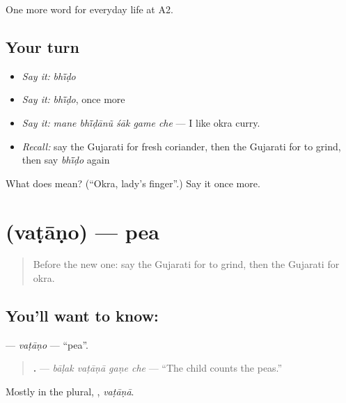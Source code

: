 \begin{grammarlens}[title={What you've built}]
One more word for everyday life at A2.
\end{grammarlens}

\subsection*{Your turn}
\begin{itemize}
\raggedright
  \item \emph{Say it:} \emph{bhī̃ḍo}
  \item \emph{Say it:} \emph{bhī̃ḍo}, once more
  \item \emph{Say it:} \emph{mane bhī̃ḍānũ śāk game che} — I like okra curry.
  \item \emph{Recall:} say the Gujarati for fresh coriander, then the Gujarati for to grind, then say \emph{bhī̃ḍo} again
\end{itemize}

\begin{tcolorbox}[breakable,colback=teal!4,colframe=teal!35!black,title={Before you move on}]
What does  mean? (\textquotedblleft{}Okra, lady's finger\textquotedblright{}.) Say it once more.
\end{tcolorbox}
\section[\texorpdfstring{\gu{વટાણો} (vaṭāṇo)}{વટાણો (vaṭāṇo)}]{ (vaṭāṇo) — pea}

\label{lesson:GU-C167-vatano}



\begin{quote}
Before the new one: say the Gujarati for to grind, then the Gujarati for okra.
\end{quote}

\subsection*{You'll want to know: }
\textbf{} — \emph{vaṭāṇo} — \textquotedblleft{}pea\textquotedblright{}.

\begin{quote}
\textbf{   .} — \emph{bāḷak vaṭāṇā gaṇe che} — \textquotedblleft{}The child counts the peas.\textquotedblright{}
\end{quote}

Mostly in the plural, \textbf{}, \emph{vaṭāṇā}.

